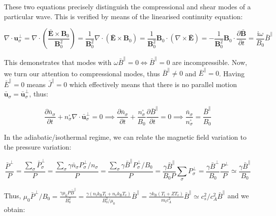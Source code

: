 These two equations precisely distinguish the compressional and shear modes of a particular wave. This is verified by means of the linearised continuity equation:

\begin{equation}
    \nabla\cdot\mathbf{u}_\sigma^\perp=\nabla\cdot\left(\frac{\bar{\mathbf{E}}\times\mathbf{B}_0}{\mathbf{B}_0^2}\right)=\frac{1}{\mathbf{B}_0^2}\nabla\cdot(\bar{\mathbf{E}}\times\mathbf{B}_0)=\frac{1}{\mathbf{B}_0^2}\mathbf{B}_0\cdot(\nabla\times\bar{\mathbf{E}})=-\frac{1}{\mathbf{B}_0^2}\mathbf{B}_0\cdot\frac{\partial\bar{\mathbf{B}}}{\partial t}=\frac{\mathrm{i}\omega}{B_0}\bar{B}^\parallel
\end{equation}

This demonstrates that modes with $\omega\bar{B}^\parallel=0\Longleftrightarrow\bar{B}^\parallel=0$ are incompressible. Now, we turn our attention to compressional modes, thus $\bar{B}^\parallel\neq0$ and $\bar{E}^\parallel=0$. Having $\bar{E}^\parallel=0$ means $\bar{J}^\parallel=0$ which effectively means that there is no parallel motion $\bar{\mathbf{u}}_\sigma=\bar{\mathbf{u}}_\sigma^\perp$, thus:

\begin{equation}
    \frac{\partial\bar{n}_\sigma}{\partial t}+n_\sigma^\square\nabla\cdot\bar{\mathbf{u}}_\sigma^\perp=0\implies\frac{\partial\bar{n}_\sigma}{\partial t}+\frac{n_\sigma^\square}{B_0}\frac{\partial\bar{B}^\parallel}{\partial t}=0\implies\frac{\bar{n}_\sigma}{n_\sigma^\square}=\frac{\bar{B}^\parallel}{B_0}
\end{equation}

In the adiabatic/isothermal regime, we can relate the magnetic field variation to the pressure variation:

\begin{equation}
    \frac{\bar{P}^\perp}{P}=\frac{\sum_\sigma\bar{P}_\sigma^\perp}{P}=\frac{\sum_\sigma\gamma\bar{n}_\sigma P_\sigma^\perp/n_\sigma}{P}=\frac{\sum_{\sigma}\gamma\bar{B}^\parallel P_\sigma^\perp/B_0}{P}=\frac{\gamma\bar{B}^\parallel}{B_0P}\sum_\sigma P_\sigma^\perp=\frac{\gamma\bar{B}^\perp}{B_0}\frac{P^\perp}{P}\simeq\frac{\gamma\bar{B}^\parallel}{B_0}
\end{equation}

Thus, $\mu_0\bar{P}^\perp/B_0=\frac{\gamma\mu_0P\bar{B}^\parallel}{B_0^2}=\frac{\gamma(n_\mathrm{i}k_\mathrm{B}T_\mathrm{i}+n_\text{e}k_\mathrm{B}T_\text{e})}{B_0^2/\mu_0}\bar{B}^\parallel=\frac{\gamma k_\mathrm{B}(T_\mathrm{i}+ZT_\text{e})}{m_\mathrm{i}c_A^2}\bar{B}^\parallel\simeq c_s^2/c_A^2\bar{B}^\parallel$ and we obtain:

